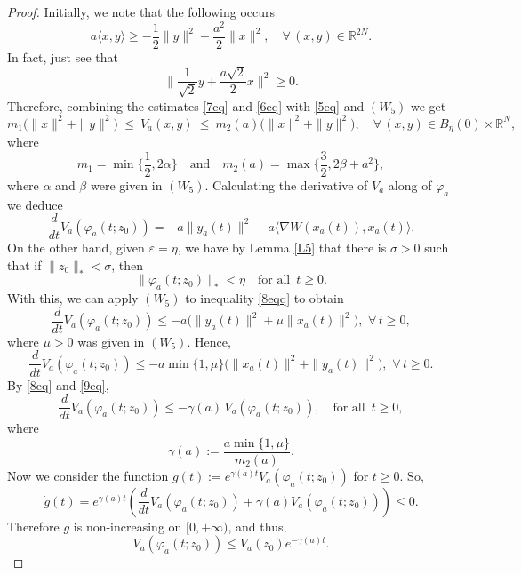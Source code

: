 \documentclass[12pt]{amsart}
\numberwithin{equation}{section}
\begin{document}
\begin{proof}
Initially, we note that the following occurs
\begin{equation}\label{6eq}
	a\langle x,y\rangle \ge-\frac12\|y\|^2 - \frac{a^2}{2}\|x\|^2,\quad  \forall\,(x,y)\in\mathbb{R}^{2N}.
\end{equation}
In fact, just see that
$$
\Big\| \frac{1}{\sqrt{2}}y + \frac{a\sqrt{2}}{2}x \Big\|^2\ge 0.
$$ 
Therefore, combining the estimates \eqref{7eq} and \eqref{6eq} with \eqref{5eq} and \hyperlink{W5}{$(W_5)$} we get
\begin{equation}\label{8eq}
	m_1\big(\|x\|^2+\|y\|^2\big)\ \le\ V_a(x,y)\ \le\ m_2(a)\big(\|x\|^2+\|y\|^2\big),\quad \forall \, (x,y) \in B_\eta(0)\times \mathbb{R}^N,
\end{equation}
where 
$$
m_1=\min\Big\{\frac{1}{2},2\alpha\Big\}\quad\text{and}\quad m_2(a)=\max\Big\{\frac{3}{2},2\beta+a^2\Big\},
$$
where $\alpha$ and $\beta$ were given in \hyperlink{W5}{$(W_5)$}. Calculating the derivative of $V_a$ along of $\varphi_a$ we deduce 
\begin{equation}\label{8eqq}
	\frac{d}{dt}V_a(\varphi_a(t;z_0))=  -a\|y_a(t)\|^2 - a\langle \nabla W(x_a(t)),x_a(t)\rangle.
\end{equation}
On the other hand, given $\varepsilon=\eta$, we have by Lemma \ref{L5} that there is $\sigma>0$ such that if $\|z_0\|_*<\sigma$, then 
$$
\|\varphi_a(t;z_0)\|_* < \eta\quad\text{for all }\, t \geq 0.
$$ 
With this, we can apply \hyperlink{W1}{$(W_5)$} to inequality \eqref{8eqq} to obtain
$$
\frac{d}{dt}V_a(\varphi_a(t;z_0))\le -a\Big(\|y_a(t)\|^2+\mu\|x_a(t)\|^2\Big), \,\,  \forall \, t\ge 0,
$$
where $\mu>0$ was given in \hyperlink{W5}{$(W_5)$}. Hence, 
\begin{equation}\label{9eq}
	\frac{d}{dt}V_a(\varphi_a(t;z_0))\le -a\min\{1,\mu\}\big(\|x_a(t)\|^2+\|y_a(t)\|^2\big),\,\,  \forall \, t\ge 0.
\end{equation}
By \eqref{8eq} and \eqref{9eq}, 
$$
\frac{d}{dt}V_a(\varphi_a(t;z_0)) \le  -\gamma(a)\, V_a(\varphi_a(t;z_0)),\quad\text{for all }\, t\ge 0,
$$
where 
$$
\gamma(a):=\frac{a\min\{1,\mu\}}{m_2(a)}. 
$$
Now we consider the function $g(t):=e^{\gamma(a) t}V_a(\varphi_a(t;z_0))$ for $t\ge 0$. So, 
$$
\dot{g}(t)=e^{\gamma(a) t}\left(\frac{d}{dt}V_a(\varphi_a(t;z_0))+\gamma(a) V_a(\varphi_a(t;z_0))\right)\le 0.
$$
Therefore $g$ is non-increasing on $[0,+\infty)$, and thus, 
\begin{equation}\label{10eq}
	V_a(\varphi_a(t;z_0))\le V_a(z_0)e^{-\gamma(a) t}.
\end{equation}

\end{proof}
\end{document}
